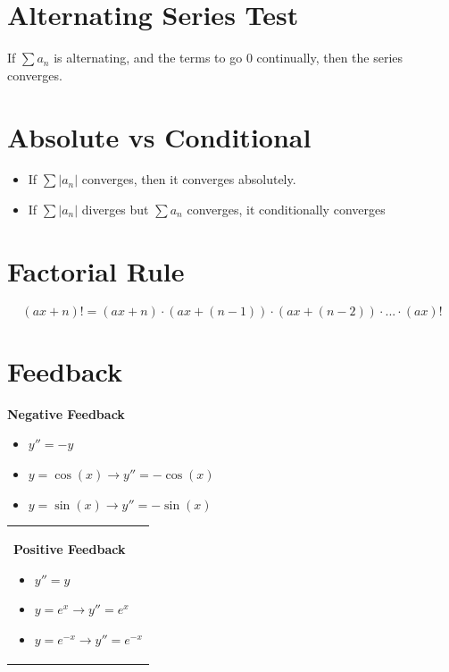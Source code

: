 \documentclass[12pt]{article}
\begin{document}
\section{Alternating Series Test} If $\sum a_n$ is alternating, and the terms to go $0$ continually, then the series converges.

\section{Absolute vs Conditional}
\begin{itemize}
    \item If $\sum |a_n|$ converges, then it converges absolutely.
    \item If $\sum |a_n|$ diverges but $\sum a_n$ converges, it conditionally converges
\end{itemize}


\section{Factorial Rule}
$$(ax+n)! = (ax+n) \cdot (ax+(n-1)) \cdot (ax+(n-2)) \cdot ... \cdot (ax)!$$



\section{Feedback}

\begin{minipage}{0.5\textwidth}
\textbf{Negative Feedback}
\begin{itemize}
    \item $y''=-y$
    \item $y=\cos(x) \to y'' = -\cos(x)$
    \item $y=\sin(x) \to y'' = -\sin(x)$
\end{itemize}

\hfill
\end{minipage}
\begin{minipage}{0.45\textwidth}
\begin{tabular}{|p{\textwidth}}

\textbf{Positive Feedback}
\begin{itemize}
    \item $y''=y$
    \item $y=e^x \to y'' = e^x$
    \item $y=e^{-x} \to y'' = e^{-x}$
\end{itemize}

\end{tabular}
\end{minipage}
\end{document}
